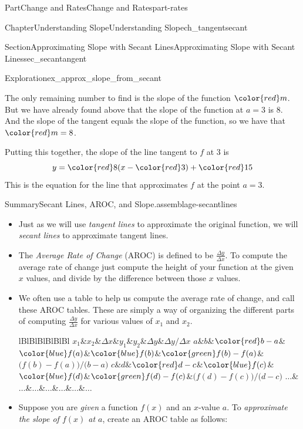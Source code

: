 \documentclass[oneside,10pt,]{tufte-book}
\newcommand{\tabularfont}{\relax}
\numberwithin{equation}{chapter}
\newcommand{\hrulemedium}{\noalign{\hrule height 0.07em}}
\begin{document}
\begin{partptx}{Part}{Change and Rates}{}{Change and Rates}{}{}{part-rates}
\begin{chapterptx}{Chapter}{Understanding Slope}{}{Understanding Slope}{}{}{ch_tangentsecant}
\begin{sectionptx}{Section}{Approximating Slope with Secant Lines}{}{Approximating Slope with Secant Lines}{}{}{sec_secantangent}
\begin{exploration}{Exploration}{}{ex_approx_slope_from_secant}
\begin{enumerate}[font=\bfseries,label=(\alph*),ref=\alph*]
\par
The only remaining number to find is the slope of the function \(\color{red} m\).  But we have already found above that the slope of the function at \(a=3\) is \(8\).  And the slope of the tangent equals the slope of the function, so we have that \(\color{red} m = 8\).%
\par
Putting this together, the slope of the line tangent to \(f\) at 3 is%
\begin{equation*}
y = {\color{red} 8 }( x - {\color{red} 3}) + {\color{red} 15}
\end{equation*}
This is the equation for the line that approximates \(f\) at the point \(a=3\).%
\end{enumerate}%
\end{exploration}%
\begin{assemblage}{Summary}{Secant Lines, AROC, and Slope.}{assemblage-secantlines}%
%
\begin{itemize}[label=\textbullet]
\item{}Just as we will use \emph{tangent lines} to approximate the original function, we will \emph{secant lines} to approximate tangent lines.%
\item{}The \emph{Average Rate of Change} (AROC) is defined to be \(\frac{\Delta y}{\Delta x}\). To compute the average rate of change just compute the height of your function at the given \(x\) values, and divide by the difference between those \(x\) values.%
\item{}We often use a table to help us compute the average rate of change, and call these AROC tables.  These are simply a way of organizing the different parts of computing   \(\frac{\Delta y}{\Delta x}\) for various values of \(x_1\) and \(x_2\).%
\begin{center}%
{\tabularfont%
\begin{tabular}{lBlBlBlBlBlBl}
\(x_1\)&\(x_2\)&\(\Delta x\)&\(y_1\)&\(y_2\)&\(\Delta y\)&\(\Delta y/\Delta x\)\tabularnewline\hrulemedium
\(a\)&\(b\)&\(\color{red} b-a\)&\(\color{blue} f(a) \)&\(\color{blue} f(b) \)&\(\color{green} f(b) - f(a) \)&\(\Big(f(b) - f(a)\Big)/\Big(b-a\Big) \)\tabularnewline\hrulemedium
\(c\)&\(d\)&\(\color{red} d-c\)&\(\color{blue} f(c) \)&\(\color{blue} f(d) \)&\(\color{green} f(d) - f(c) \)&\(\Big(f(d) - f(c)\Big)/\Big(d-c\Big) \)\tabularnewline\hrulemedium
\(\dots\)&\(\dots\)&\(\dots\)&\(\dots\)&\(\dots\)&\(\dots\)&\(\dots\)
\end{tabular}
}%
\end{center}%
\item{}Suppose you are \emph{given} a function \(f(x)\) and an \(x\)-value \(a\). To \emph{approximate the slope of \(f(x)\) at \(a\)}, create an AROC table as follows:%

\end{itemize}
\end{assemblage}
\end{sectionptx}
\end{chapterptx}
\end{partptx}
\end{document}

